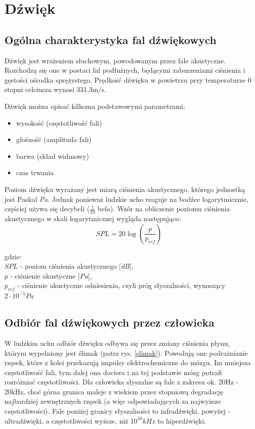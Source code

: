 \chapter{Dźwięk}
\label{cha:dwiek}

\section{Ogólna charakterystyka fal dźwiękowych}
Dźwięk jest wrażeniem słuchowym, powodowanym przez fale akustyczne. Rozchodzą się one w postaci fal podłużnych, będącymi zaburzeniami ciśnienia i gęstości ośrodka sprężystego\cite{FaleAkustyczne}. Prędkość dźwięku w powietrzu przy temperaturze 0 stopni celciusza wynosi 331,3m/s.

Dźwięk można opisać kilkoma podstawowymi parametrami:

\begin{itemize}
	\item wysokość (częstotliwość fali)
	\item głośność (amplituda fali)
	\item barwa (skład widmowy)
	\item czas trwania
\end{itemize}

Poziom dźwięku wyrażany jest miarą ciśnienia akustycznego, którego jednostką jest Paskal \textit{Pa}. Jednak ponieważ ludzkie ucho reaguje na bodźce logarytmicznie, częściej używa się decybeli ($\frac{1}{10}$ bela). Wzór na obliczenie poziomu ciśnienia akustycznego w skali logarytmicznej wygląda następująco\cite{CisnienieAkustyczne}:
\begin{equation}
SPL = 20\log{(\frac{p}{p_{ref}})}
\end{equation}

gdzie: \\
\indent$SPL$ - poziom ciśnienia akustycznego [\textit{dB}], \\
\indent$p$ - ciśnienie akustyczne [\textit{Pa}], \\
\indent$p_{ref}$ - ciśnienie akustyczne odniesienia, czyli próg słyszalności, wynoszący $2\cdot10^{-5} Pa$ 


\section{Odbiór fal dźwiękowych przez człowieka}
W ludzkim uchu odbiór dźwięku odbywa się przez zmiany ciśnienia płynu, którym wypełniony jest ślimak (patrz rys. \ref{slimak}). Powodują one podrażnianie rzęsek, które z kolei przekazują impulsy elektrochemiczne do mózgu. Im mniejsza częstotliwość fali, tym dalej ona dociera i na tej podstawie mózg potrafi rozróżniać częstotliwości. Dla człowieka słyszalne są fale z zakresu ok. 20Hz - 20kHz, choć górna granica maleje z wiekiem przez stopniową degradację najbardziej zewnętrznych rzęsek (a więc odpowiadających za najwyższe częstotliwości)\cite{JakSlyszymy}. 
Fale poniżej granicy słyszalności to infradźwięki, powyżej - ultradźwięki, a częstotliwości wyższe, niż $10^{10}kHz$ to hiperdźwięki.

